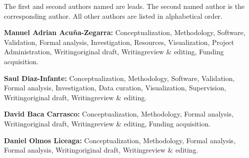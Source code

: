 The first and second authors named are leads. The second named author is the
corresponding author. All other authors are listed in alphabetical order.

\textbf{Manuel Adrian Acu\~na-Zegarra:}
    Conceptualization,
    Methodology,
    Software,
    Validation,
    Formal analysis,
    Investigation,
    Resources,
    Visualization,
    Project Administration,
    Writing\textendash original draft,
    Writing\textendash review \& editing,
    Funding acquisition.

\textbf{Saul Diaz-Infante:}
    Conceptualization,
    Methodology,
    Software,
    Validation,
    Formal analysis,
    Investigation,
    Data curation,
    Visualization,
    Supervision,
    Writing\textendash original draft,
    Writing\textendash review \& editing.

\textbf{David Baca Carrasco:}
    Conceptualization,
    Methodology,
    Formal analysis,
    Writing\textendash original draft,
    Writing\textendash review \& editing,
    Funding acquisition.

\textbf{Daniel Olmos Liceaga:}
    Conceptualization,
    Methodology,
    Formal analysis,
    Formal analysis,
    Writing\textendash original draft,
    Writing\textendash review \& editing.